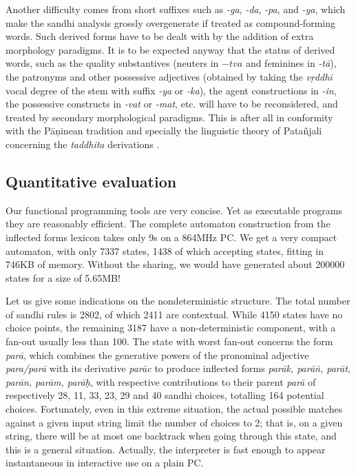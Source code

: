 Another difficulty comes from short suffixes
such as {\sl -ga}, {\sl -da}, {\sl -pa}, and {\sl -ya}, 
which make the sandhi analysis grossly
overgenerate if treated as compound-forming words. Such derived forms
have to be dealt with by the addition of extra morphology paradigms.
It is to be expected anyway that the status of derived words, such as the
quality substantives (neuters in $-tva$ and feminines in {\sl -t\=a}), the
patronyms and other possessive adjectives (obtained by taking the
{\sl v{\d r}ddhi} vocal degree of the stem with suffix {\sl -ya} or {\sl -ka}),
the agent constructions in {\sl -in}, the possessive constructs in 
{\sl -vat} or {\sl -mat}, etc. will have to be reconsidered, 
and treated by secondary
morphological paradigms. This is after all in conformity with 
the P\=a{\d n}inean tradition and specially the linguistic theory of
Pata{\~n}jali concerning the {\sl taddhita} %
derivations \cite{filliozat}. 

\subsection{Quantitative evaluation}

Our functional programming tools are very concise. Yet as executable 
programs they are reasonably efficient. 
The complete automaton construction from the inflected forms lexicon takes
only 9s on a 864MHz PC. %
We get a very
compact automaton, with only 7337 states, 1438 of which accepting states,
fitting in 746KB of memory. Without the sharing, we would have generated
about 200000 states for a size of 5.65MB! 

Let us give some indications on the nondeterministic structure. The total
number of sandhi rules is 2802, of which 2411 are contextual. 
While 4150 states have no choice points, the remaining 3187
have a non-deterministic component, with a fan-out
usually less than 100. The state with
worst fan-out concerns the form {\sl par\=a},
which combines the generative powers of the pronominal adjective 
{\sl para/par\=a} with its derivative {\sl par\=ac} to produce
inflected forms {\sl par\=ak, par\=a\.n, par\=at, par\=an, par\=am, par\=a{\d h}},
with respective contributions to their parent {\sl par\=a} of
respectively 28, 11, 33, 23, 29 and 40 sandhi choices, totalling 
164 potential choices. Fortunately, even in this extreme situation,
the actual possible matches against a given input string limit the number
of choices to 2; that is, on a given string, there will be at most one
backtrack when going through this state, and this is a general situation. 
Actually, the interpreter is fast enough to appear instantaneous in 
interactive use on a plain PC. 

